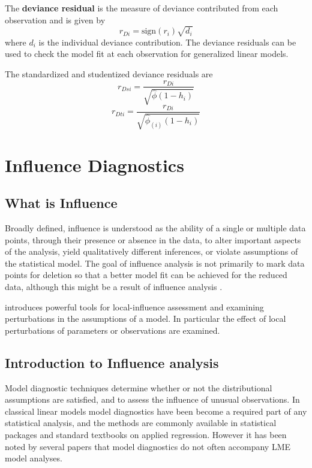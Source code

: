 \documentclass[12pt, a4paper]{report}
\theoremstyle{plain}
\theoremstyle{definition}
\theoremstyle{remark}
\begin{document}
	
	
	
	
	The \textbf{deviance residual} is the measure of deviance contributed from each observation and is given by
	\[r_{Di} = \textrm{sign}( r_{i})
	\sqrt{ d_{i}}\]
	where $d_i$ is the individual deviance contribution.
	The deviance residuals can be used to check the model fit at each observation for generalized linear models. 
	
	
	The standardized and studentized deviance residuals are
	\[
	r_{Dsi} = \frac{r_{Di}}{\sqrt{\hat{ \phi} (1- h_{i})} }\]
	\[r_{Dti} = \frac{r_{Di}}{\sqrt{ \hat{ \phi}_{(i)}
			(1- h_{i})}}\]
	
	
	
\chapter{Influence Diagnostics}




\section{What is Influence} %


Broadly defined, influence is understood as the ability of a single or multiple data points, through their presence or absence in the data, to alter important aspects of the analysis, yield qualitatively different inferences, or violate assumptions of the statistical model. The goal of influence analysis is not primarily to mark data points for deletion so that a better model fit can be achieved for the reduced data, although this might be a result of influence analysis \citep{schabenberger}.



\citet{cook86} introduces powerful tools for local-influence assessment and examining perturbations in the assumptions of a model. In particular the effect of local perturbations of parameters or observations are examined.


	\section{Introduction to Influence analysis} %
	Model diagnostic techniques determine whether or not the distributional assumptions are satisfied, and to assess the influence of unusual observations. In classical linear models model diagnostics have been become a required part of any statistical analysis, and the methods are commonly available in statistical packages and standard textbooks on applied regression. However it has been noted by several papers that model diagnostics do not often accompany LME model analyses.
	
\end{document}
